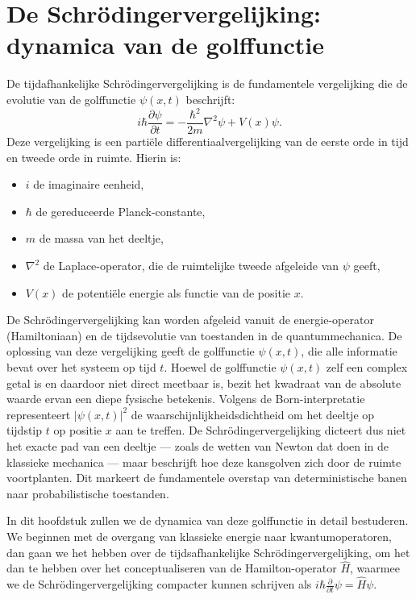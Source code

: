 \documentclass{report} %
\begin{document}
    \chapter{De Schrödingervergelijking: dynamica van de golffunctie}
    De tijdafhankelijke Schrödingervergelijking is de fundamentele vergelijking die de evolutie van de golffunctie $\psi(x,t)$ beschrijft:
    \[
        i\hbar \frac{\partial \psi}{\partial t} = -\frac{\hbar^2}{2m} \nabla^2 \psi + V(x)\psi.
    \]
    Deze vergelijking is een partiële differentiaalvergelijking van de eerste orde in tijd en tweede orde in ruimte. Hierin is:
    \begin{itemize}
        \item $i$ de imaginaire eenheid,
        \item $\hbar$ de gereduceerde Planck-constante,
        \item $m$ de massa van het deeltje,
        \item $\nabla^2$ de Laplace-operator, die de ruimtelijke tweede afgeleide van $\psi$ geeft,
        \item $V(x)$ de potentiële energie als functie van de positie $x$.
    \end{itemize}
    De Schrödingervergelijking kan worden afgeleid vanuit de energie-operator (Hamiltoniaan) en de tijdsevolutie van toestanden in de quantummechanica.
    De oplossing van deze vergelijking geeft de golffunctie $\psi(x,t)$, die alle informatie bevat over het systeem op tijd $t$.
    Hoewel de golffunctie $\psi(x,t)$ zelf een complex getal is en daardoor niet direct meetbaar is, bezit het kwadraat van de absolute waarde ervan een diepe fysische betekenis.
    Volgens de Born-interpretatie representeert $|\psi(x,t)|^2$ de waarschijnlijkheidsdichtheid om het deeltje op tijdstip $t$ op positie $x$ aan te treffen.
    De Schrödingervergelijking dicteert dus niet het exacte pad van een deeltje — zoals de wetten van Newton dat doen in de klassieke mechanica —
    maar beschrijft hoe deze kansgolven zich door de ruimte voortplanten.
    Dit markeert de fundamentele overstap van deterministische banen naar probabilistische toestanden.

    In dit hoofdstuk zullen we de dynamica van deze golffunctie in detail bestuderen.
    We beginnen met de overgang van klassieke energie naar kwantumoperatoren, dan gaan we het hebben over de tijdsafhankelijke Schrödingervergelijking, om het dan te hebben over
    het conceptualiseren van de Hamilton-operator $\hat{H}$, waarmee we de Schrödingervergelijking compacter kunnen schrijven als $i\hbar \frac{\partial}{\partial t}\psi = \hat{H}\psi$.
\end{document}

